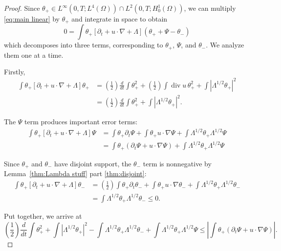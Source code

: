 \documentclass[11pt]{amsart}
\theoremstyle{remark}
\theoremstyle{definition}
\newcommand{\paren}[1]{\left( #1 \right)}
\newcommand{\bracket}[1]{\left[ #1 \right]}
\newcommand{\abs}[1]{\left\lvert #1 \right\rvert}
\newcommand{\del}{\partial}
\newcommand{\grad}{\nabla}
\newcommand{\ddt}{\frac{d}{dt}}
\renewcommand{\div}{\operatorname{div}}
\begin{document}
\begin{proof}
Since $\theta_+ \in L^\infty(0,T; L^4(\Omega)) \cap L^2(0,T; H_0^1(\Omega))$, we can multiply \eqref{eq:main linear} by $\theta_+$ and integrate in space to obtain
\[ 0 = \int \theta_+ \bracket{ \del_t + u \cdot \grad + \Lambda } \paren{\theta_+ + \Psi - \theta_-} \]
which decomposes into three terms, corresponding to $\theta_+$, $\Psi$, and $\theta_-$.  We analyze them one at a time.  

Firstly,
\begin{align*} 
\int \theta_+ \bracket{ \del_t + u \cdot \grad + \Lambda } \theta_+ &= \paren{\frac{1}{2}} \ddt \int \theta_+^2 + \paren{\frac{1}{2}} \int \div u \, \theta_+^2 + \int \abs{\Lambda^{1/2} \theta_+}^2
\\ &= \paren{\frac{1}{2}} \ddt \int \theta_+^2 + \int \abs{\Lambda^{1/2} \theta_+}^2.
\end{align*}

The $\Psi$ term produces important error terms:
\begin{align*} 
\int \theta_+ \bracket{ \del_t + u \cdot \grad + \Lambda } \Psi &= \int \theta_+ \del_t \Psi + \int \theta_+ u \cdot \grad \Psi + \int \Lambda^{1/2} \theta_+ \Lambda^{1/2} \Psi
\\ &= \int \theta_+ (\del_t \Psi + u \cdot \grad \Psi) + \int \Lambda^{1/2} \theta_+ \Lambda^{1/2} \Psi
\end{align*}

Since $\theta_+$ and $\theta_-$ have disjoint support, the $\theta_-$ term is nonnegative by Lemma~\ref{thm:Lambda stuff} part \eqref{thm:disjoint}:
\begin{align*} 
\int \theta_+ \bracket{ \del_t + u \cdot \grad + \Lambda } \theta_- &= \paren{\frac{1}{2}} \int \theta_+ \del_t \theta_- + \int \theta_+ u \cdot \grad \theta_- + \int \Lambda^{1/2} \theta_+ \Lambda^{1/2} \theta_-
\\ &= \int \Lambda^{1/2} \theta_+ \Lambda^{1/2} \theta_- \leq 0.
\end{align*}

Put together, we arrive at 
\begin{equation} \label{first form of cacciopolli} \paren{\frac{1}{2}} \ddt \int \theta_+^2 + \int \abs{\Lambda^{1/2} \theta_+}^2 - \int \Lambda^{1/2}\theta_+ \Lambda^{1/2} \theta_- + \int \Lambda^{1/2} \theta_+ \Lambda^{1/2} \Psi \leq \abs{\int \theta_+ (\del_t \Psi + u \cdot \grad \Psi)}. \end{equation}


\end{proof}
\end{document}
